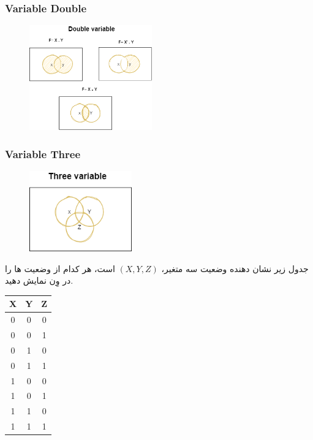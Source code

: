 \documentclass[20pt, a5paper]{article}
\begin{document}
\subsubsection{Variable Double}

\begin{figure}[htbp]
	\centerline{\includegraphics[width=150pt]{img/venn/venn-double Variable.png}}
\end{figure}
\newpage
\subsubsection{Variable Three}

\begin{figure}[htbp]
	\centerline{\includegraphics[width=125pt]{img/venn/venn-three_variable.png}}
\end{figure}
جدول زیر نشان دهنده وضعیت سه متغیر، $(X, Y, Z)$ است، هر کدام از وضعیت ها را در وِن نمایش دهید.

\center 
\begin{LTR}
	\begin{tabular}{ c c c }
		X & Y & Z \\
		\hline
		0 & 0 & 0 \\ 				
		0 & 0 & 1 \\
		0 & 1 & 0 \\
		0 & 1 & 1 \\
		1 & 0 & 0 \\
		1 & 0 & 1 \\
		1 & 1 & 0 \\
		1 & 1 & 1 \\	
	\end{tabular}
\end{LTR}
\end{document}
